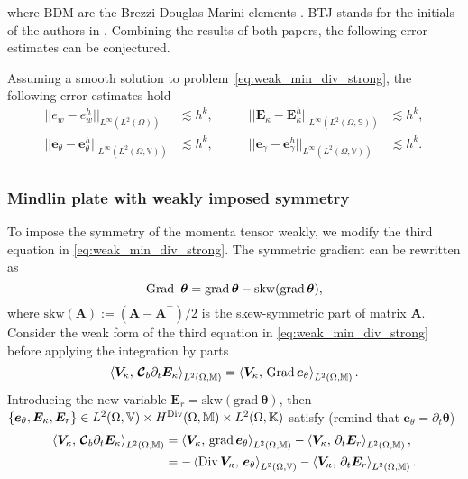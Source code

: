 where $\mathrm{BDM}$ are the Brezzi-Douglas-Marini elements \cite{brezzi1985bdm}. BTJ stands for the initials of the authors in \cite{becache2000wave,becache2001elas}. Combining the results of both papers, the following error estimates can be conjectured.
\begin{conjecture}\label{conj:BJTestimates}
	Assuming a smooth solution to problem~\eqref{eq:weak_min_div_strong}, the following error estimates hold 
	\begin{equation}
	\label{eq:errBEC}
	\begin{aligned}
	||e_w - e_w^h||_{L^{\infty}(L^2(\Omega))} &\lesssim h^{k}, \\
	||\bm{e}_\theta - \bm{e}_\theta^h||_{L^{\infty}(L^2(\Omega, \mathbb{V}))} &\lesssim h^{k}, \\
	\end{aligned} \qquad
	\begin{aligned}
	||\bm{E}_\kappa - \bm{E}_\kappa^h||_{L^{\infty}(L^2(\Omega, \mathbb{S}))} &\lesssim  h^{k}, \\
	||\bm{e}_\gamma - \bm{e}_\gamma^ h||_{L^{\infty}(L^2(\Omega, \mathbb{V}))} &\lesssim  h^{k}. \\
	\end{aligned} 
	\end{equation}
	
\end{conjecture}


\subsubsection{Mindlin plate with weakly imposed symmetry}\label{sec:min_weak}
To impose the symmetry of the momenta tensor weakly, we modify the third equation in \eqref{eq:weak_min_div_strong}. The symmetric gradient can be rewritten as 
\[
\Grad\ \bm{\theta} = \grad \bm{\theta} - \mathrm{skw}(\grad \bm{\theta}),
\]
where $\mathrm{skw}(\bm{A}):=(\bm{A} - \bm{A}^\top)/2$ is the skew-symmetric part of matrix $\bm{A}$. Consider the weak form of the third equation in \eqref{eq:weak_min_div_strong} before applying the integration by parts
\[
\inner[L^2(\Omega, \mathbb{M})]{\bm{V}_\kappa}{\bm{\mathcal{C}}_b \partial_t {\bm{E}}_\kappa} = \inner[L^2(\Omega, \mathbb{M})]{\bm{V}_\kappa}{\Grad \bm{e}_\theta}. 
\] Introducing the new variable $\bm{E}_r = \mathrm{skw}(\mathrm{grad}\ \bm{\theta})$, then $\{\bm{e}_\theta, \bm{E}_\kappa, \bm{E}_r\} \in L^2(\Omega, \mathbb{V}) \times H^{\Div}(\Omega, \mathbb{M}) \times L^2(\Omega, \mathbb{K})$ satisfy (remind that $\bm{e}_\theta = \partial_t {\bm{\theta}}$)
\begin{equation*}
\begin{aligned}
\inner[L^2(\Omega, \mathbb{M})]{\bm{V}_\kappa}{\bm{\mathcal{C}}_b \partial_t {\bm{E}}_\kappa} &= \inner[L^2(\Omega, \mathbb{M})]{\bm{V}_\kappa}{\grad \bm{e}_\theta} - \inner[L^2(\Omega, \mathbb{M})]{\bm{V}_\kappa}{\partial_t {\bm{E}}_r}, \\
&= -\inner[L^2(\Omega, \mathbb{V})]{\Div\bm{V}_\kappa}{\bm{e}_\theta} - \inner[L^2(\Omega, \mathbb{M})]{\bm{V}_\kappa}{\partial_t{\bm{E}}_r}.
\end{aligned}
\end{equation*}


